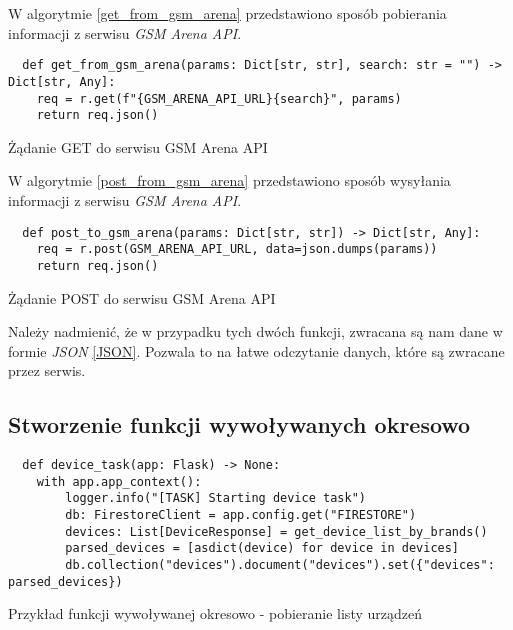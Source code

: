 W algorytmie \ref{get_from_gsm_arena} przedstawiono sposób pobierania informacji z serwisu \textit{GSM Arena API}.

\begin{code}[H]
  \begin{verbatim}
  def get_from_gsm_arena(params: Dict[str, str], search: str = "") -> Dict[str, Any]:
    req = r.get(f"{GSM_ARENA_API_URL}{search}", params)
    return req.json()
  \end{verbatim}
  \caption{Żądanie GET do serwisu GSM Arena API}
  \label{get_from_gsm_arena}
\end{code}

W algorytmie \ref{post_from_gsm_arena} przedstawiono sposób wysyłania informacji z serwisu \textit{GSM Arena API}.
\begin{code}[H]
  \begin{verbatim}
  def post_to_gsm_arena(params: Dict[str, str]) -> Dict[str, Any]:
    req = r.post(GSM_ARENA_API_URL, data=json.dumps(params))
    return req.json()
  \end{verbatim}
  \caption{Żądanie POST do serwisu GSM Arena API}
  \label{post_from_gsm_arena}
\end{code}

Należy nadmienić, że w przypadku tych dwóch funkcji, zwracana są nam dane w formie \textit{JSON} \ref{JSON}. Pozwala to na łatwe odczytanie danych, które są zwracane przez serwis.

\subsection{Stworzenie funkcji wywoływanych okresowo}


\begin{code}[H]
  \begin{verbatim}
  def device_task(app: Flask) -> None:
    with app.app_context():
        logger.info("[TASK] Starting device task")
        db: FirestoreClient = app.config.get("FIRESTORE")
        devices: List[DeviceResponse] = get_device_list_by_brands()
        parsed_devices = [asdict(device) for device in devices]
        db.collection("devices").document("devices").set({"devices": parsed_devices})
  \end{verbatim}
  \caption{Przykład funkcji wywoływanej okresowo - pobieranie listy urządzeń}
  \label{device_task}
\end{code}

